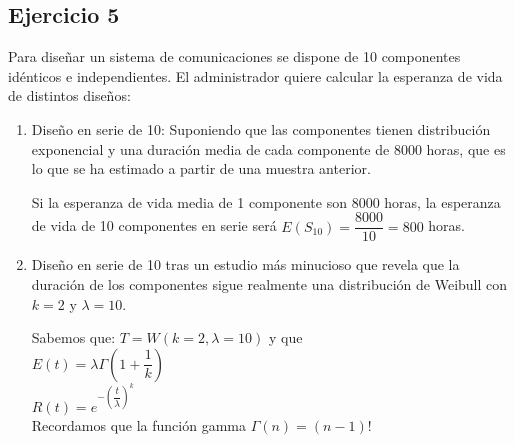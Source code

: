\subsection{Ejercicio 5}
Para diseñar un sistema de comunicaciones se dispone de 10 componentes idénticos e independientes. El administrador quiere calcular la esperanza de vida de distintos diseños:
\begin{enumerate}
    \item Diseño en serie de 10: Suponiendo que las componentes tienen distribución exponencial y una duración media de cada componente de 8000 horas, que es lo que se ha estimado a partir de una muestra anterior.
    \begin{tcolorbox}[colback=white,colframe=cyan!50!black,fonttitle=\bfseries]
    Si la esperanza de vida media de 1 componente son 8000 horas, la esperanza de vida de 10 componentes en serie será $E(S_{10})=\dfrac{8000}{10}=800$ horas.
    \end{tcolorbox}
    \item Diseño en serie de 10 tras un estudio más minucioso que revela que la duración  de los componentes sigue realmente una distribución de Weibull con $k=2$ y $\lambda=10$.
    \begin{tcolorbox}[colback=white,colframe=cyan!50!black,fonttitle=\bfseries]
    Sabemos que: $T=W(k=2, \lambda=10)$ y que \\
    $E(t) = \lambda \Gamma (1+\dfrac{1}{k})$\\
    $R(t) = e^{-(\dfrac{t}{\lambda})^k}$\\
    Recordamos que la función gamma $\Gamma(n) = (n-1)!$\\
    

\end{tcolorbox}
\end{enumerate}
